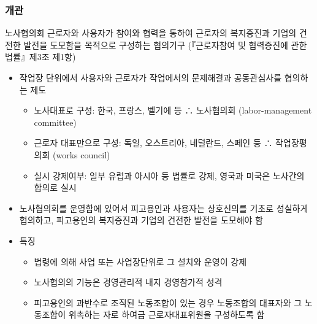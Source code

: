 \documentclass[aspectratio=169,xcolor=dvipsnames,handout]{beamer}
\begin{document}
\begin{frame}[allowframebreaks]
    \frametitle{개관}
    \begin{block}{노사협의회}
        근로자와 사용자가 참여와 협력을 통하여 근로자의 복지증진과 기업의 건전한 발전을 도모함을 목적으로 구성하는 협의기구 (『근로자참여 및 협력증진에 관한 법률』제3조 제1항)
    \end{block}
    \begin{itemize}[<+->]
        \item 작업장 단위에서 사용자와 근로자가 작업에서의 문제해결과 공동관심사를 협의하는 제도
        \begin{itemize}[<+->]
            \item 노사대표로 구성: 한국, 프랑스, 벨기에 등 ∴ 노사협의회 (labor-management committee)
            \item 근로자 대표만으로 구성: 독일, 오스트리아, 네덜란드, 스페인 등 ∴ 작업장평의회 (works council)
            \item 실시 강제여부: 일부 유럽과 아시아 등 법률로 강제, 영국과 미국은 노사간의 합의로 실시
        \end{itemize}
    \framebreak\relax
        \item 노사협의회를 운영함에 있어서 피고용인과 사용자는 상호신의를 기초로 성실하게 협의하고, 피고용인의 복지증진과 기업의 건전한 발전을 도모해야 함
        \item 특징
        \begin{itemize}[<+->]
            \item 법령에 의해 사업 또는 사업장단위로 그 설치와 운영이 강제
            \item 노사협의의 기능은 경영관리적 내지 경영참가적 성격
            \item 피고용인의 과반수로 조직된 노동조합이 있는 경우 노동조합의 대표자와 그 노동조합이 위촉하는 자로 하여금 근로자대표위원을 구성하도록 함
        \end{itemize}
    \end{itemize}
\end{frame}
\end{document}
